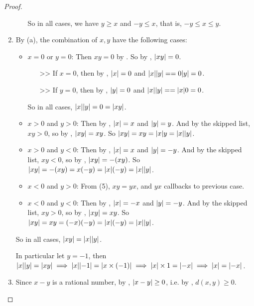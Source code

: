 \begin{proof}
\begin{enumerate}
\begin{itemize}
\begin{itemize}
                \end{itemize}
                So in all cases, we have \(y \ge x\) and \(-y \le x\), that is, \(-y \le x \le y\).
        \end{itemize}
    \item
        By (a), the combination of \(x, y\) have the following cases:
        \begin{itemize}
            \item \(x = 0\) or \(y = 0\):
                Then \(xy = 0\) by .
                So by , \(\lvert xy\rvert = 0\).
                \begin{itemize}
                    \item[>>] If \(x = 0\), then by , \(\lvert x\rvert = 0\) and \(\lvert x\rvert\lvert y\rvert = = 0\lvert y\rvert = 0\).
                    \item[>>] If \(y = 0\), then by , \(\lvert y\rvert = 0\) and \(\lvert x\rvert\lvert y\rvert = = \lvert x\rvert0 = 0\).
                \end{itemize}
                So in all cases, \(\lvert x\rvert\lvert y\rvert = 0 = \lvert xy\rvert\).
            \item \(x > 0\) and \(y > 0\):
                Then by , \(\lvert x\rvert = x\) and \(\lvert y\rvert = y\).
                And by the skipped list, \(xy > 0\), so by , \(\lvert xy\rvert = xy\).
                So \(\lvert xy\rvert = xy = \lvert x\rvert y = \lvert x\rvert\lvert y\rvert\).
            \item \(x > 0\) and \(y < 0\):
                Then by , \(\lvert x\rvert = x\) and \(\lvert y\rvert = -y\).
                And by the skipped list, \(xy < 0\), so by , \(\lvert xy\rvert = -(xy)\).
                So \(\lvert xy\rvert = -(xy) = x(-y) = \lvert x\rvert(-y) = \lvert x\rvert\lvert y\rvert\).
            \item \(x < 0\) and \(y > 0\):
                From (5), \(xy = yx\), and \(yx\) callbacks to previous case. 
            \item \(x < 0\) and \(y < 0\):
                Then by , \(\lvert x\rvert = -x\) and \(\lvert y\rvert = -y\).
                And by the skipped list, \(xy > 0\), so by , \(\lvert xy\rvert = xy\).
                So \(\lvert xy\rvert = xy = (-x)(-y) = \lvert x\rvert(-y) = \lvert x\rvert\lvert y\rvert\).
        \end{itemize}
        So in all cases, \(\lvert xy\rvert = \lvert x\rvert\lvert y\rvert\).
                        
        In particular let \(y = -1\), then \(\lvert x\rvert\lvert y\rvert = \lvert xy\rvert \implies \lvert x\rvert\lvert-1\rvert = \lvert x \times (-1)\rvert \implies \lvert x\rvert \times 1 = \lvert-x\rvert \implies \lvert x\rvert = \lvert-x\rvert\).
    \item
        Since \(x - y\) is a rational number, by , \(\lvert x - y\rvert \ge 0\), i.e. by , \(d(x, y) \ge 0\).
        

\end{enumerate}
\end{proof}
